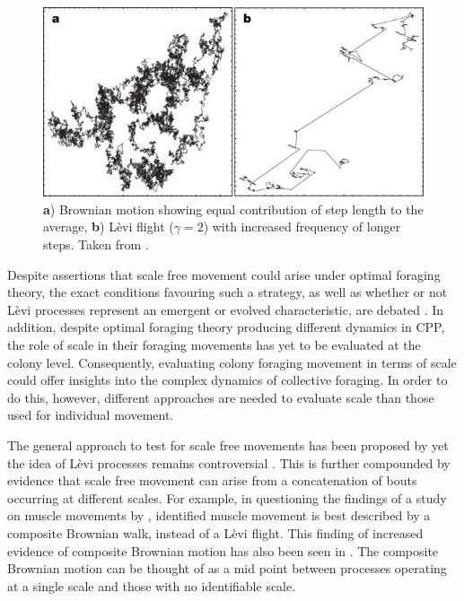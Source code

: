 \documentclass[11pt,usenames,dvipsnames]{article}
\begin{document}
\begin{figure}[H]
	\centering
	\includegraphics[scale=0.7]{LeviFlight.jpg}
	\caption{\textbf{a}) Brownian motion showing equal contribution of step length to the average, \textbf{b}) L\`evi flight ($\gamma = 2$) with increased frequency of longer steps. Taken from \cite{Barthelemy2008}.}
\end{figure}

Despite assertions that scale free movement could arise under optimal foraging theory, the exact conditions favouring such a strategy, as well as whether or not L\`evi processes represent an emergent or evolved characteristic, are debated \citep{Wosniack2017, Pyke2015, Kolzsch2015, DeJager2013}. In addition, despite optimal foraging theory producing different dynamics in CPP, the role of scale in their foraging movements has yet to be evaluated at the colony level. Consequently, evaluating colony foraging movement in terms of scale could offer insights into the complex dynamics of collective foraging. In order to do this, however, different approaches are needed to evaluate scale than those used for individual movement.

The general approach to test for scale free movements has been proposed by \cite{Murphy2007} yet the idea of L\`evi processes remains controversial \citep{Pyke2015}. This is further compounded by evidence that scale free movement can arise from a concatenation of bouts occurring at different scales. For example, in questioning the findings of a study on muscle movements by \cite{DeJager2011}, \cite{Jansen2012} identified muscle movement is best described by a composite Brownian walk, instead of a L\`evi flight. This finding of increased evidence of composite Brownian motion has also been seen in \cite{Petrovskii2011, Sakamoto2017, Gautestad2012, Zhao2016}. The composite Brownian motion can be thought of as a mid point between processes operating at a single scale and those with no identifiable scale. 
\end{document}
